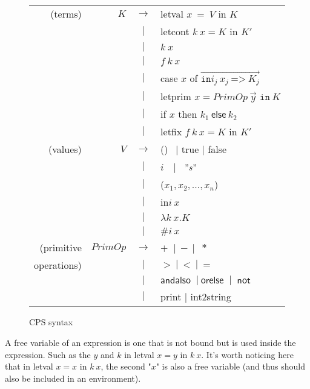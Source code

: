 \documentclass{article}
\theoremstyle{definition}
\theoremstyle{remark}
\numberwithin{equation}{section}
\begin{document}
\begin{figure}[!ht]
  \centering
\begin{tabular}{rrcl}
(terms) & $K$ & $\to$ & \textsf{letval }$x\ =\ V$ \textsf{ in } $K$ \\
        &     & $|$ & \textsf{letcont }$k\ x = K$\textsf{ in }$K'$\\
        &     & $|$ &  $k\ x$ \\
        &     & $|$ & $f\ k\ x$ \\
        &     & $|$ & \textsf{case} $x$ \textsf{of}
            $\overrightarrow{\texttt{in}i_j\ x_j\ \texttt{=>}\ K_j}$\\
        &     & $|$ & \textsf{letprim} $x=PrimOp\ \vec{y}
         \texttt{ in}\ K$\\
        &     & $|$ &\textsf{if} $x$ \textsf{then} $k_1\ \textsf{else}\ k_2$\\
        &     & $|$ &\textsf{letfix }$f\ k\ x=K$\textsf{ in }$K'$\\

(values) & $V$ & $\to$ & () $\ \ |$ \textsf{ true } $|$ \textsf{ false}\\
        &     & $|$ & $i\ \ $ $\ |\ $  $\ "s"$\\
        &     & $|$ & ($x_1,x_2, ..., x_n$)\\
        &     & $|$ & \textsf{in}$i\ x$\\
        &     & $|$ &  $\lambda k\ x.K$ \\
        &     & $|$ &  $\texttt{\#}i\ x$ \\

(primitive & $PrimOp$ & $\to$ & $+\ $ $|\ -\ |$ $\ *$\\
operations) &     & $|$ & $>\ |\ <\ |\ =$\\
        &     & $|$ & $\textsf{andalso }\ |\ \textsf{orelse }\ |\ \textsf{ not}$\\
        &     & $|$ & \textsf{print} $|$ \textsf{int2string}\\
\end{tabular}
  \caption{CPS syntax}
  \label{fig-sub}
\end{figure}

A free variable of an expression is one that is not bound but is used inside
the expression. Such as the $y$ and $k$ in \textsf{letval }$x=y$
\textsf{in} $k\ x$. It's worth noticing here that in \textsf{letval }$x=x$
\textsf{in} $k\ x$, the second "$x$" is also a free variable (and thus should
also be included in an environment).
\end{document}
